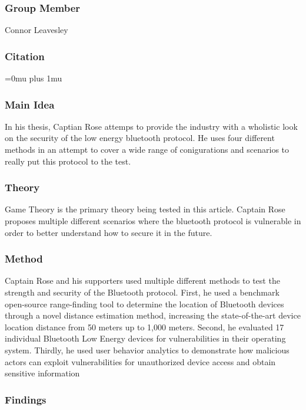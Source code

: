 \documentclass[letterpaper,12pt]{article}
\begin{document}
\subsubsection{Group Member}

\noindent
Connor Leavesley

\noindent
\subsubsection{Citation}

\Urlmuskip=0mu plus 1mu\relax
{}

\subsubsection{Main Idea}

\noindent
In his thesis, Captian Rose attemps to provide the industry with a wholistic look on the security of the low energy bluetooth protocol. He uses four different methods in an attempt to cover a wide range of conigurations and scenarios to really put this protocol to the test.

\subsubsection{Theory}

\noindent
Game Theory is the primary theory being tested in this article.  Captain Rose proposes multiple different scenarios where the bluetooth protocol is vulnerable in order to better understand how to secure it in the future.

\subsubsection{Method}

\noindent
Captain Rose and his supporters used multiple different methods to test the strength and security of the Bluetooth protocol. First, he used a benchmark open-source range-finding tool to determine the location of Bluetooth devices through a novel distance estimation method, increasing the state-of-the-art device location distance from 50 meters up to 1,000 meters. Second, he evaluated 17 individual Bluetooth Low Energy devices for vulnerabilities in their operating system. Thirdly, he used user behavior analytics to demonstrate how malicious actors can exploit vulnerabilities for unauthorized device access and obtain sensitive information

\subsubsection{Findings}
\end{document}
